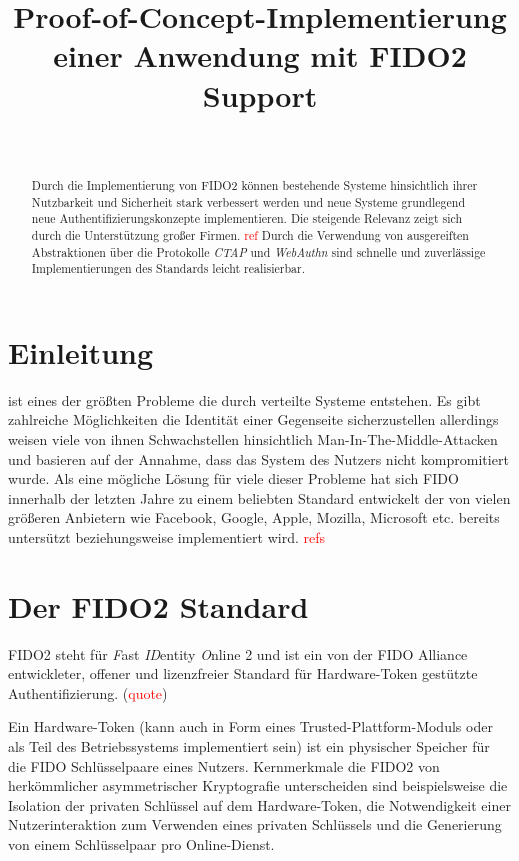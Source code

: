 \documentclass[journal]{IEEEtran}
\title{Proof-of-Concept-Implementierung einer Anwendung mit FIDO2 Support}
\author{
	\IEEEauthorblockN{Mara Schulke \textit{(Matrikel-Nr. 20215853)}}\\
	\IEEEauthorblockA{
		Technische Hochschule Brandenburg \\
		B.Sc. IT Sicherheit \\
		Hardware Sicherheit
	}
}
\begin{document}

\maketitle

\begin{abstract}
	Durch die Implementierung von FIDO2 können bestehende Systeme hinsichtlich
	ihrer Nutzbarkeit und Sicherheit stark verbessert werden und neue Systeme
	grundlegend neue Authentifizierungskonzepte implementieren. Die steigende
	Relevanz zeigt sich durch die Unterstützung großer Firmen.
	\textcolor{red}{ref} Durch die Verwendung von ausgereiften Abstraktionen
	über die Protokolle \textit{CTAP} und \textit{WebAuthn} sind schnelle und
	zuverlässige Implementierungen des Standards leicht realisierbar.
\end{abstract}

\section{Einleitung}
 ist eines der größten
Probleme die durch verteilte Systeme entstehen. Es gibt zahlreiche
Möglichkeiten die Identität einer Gegenseite sicherzustellen allerdings weisen
viele von ihnen Schwachstellen hinsichtlich Man-In-The-Middle-Attacken und
basieren auf der Annahme, dass das System des Nutzers nicht kompromitiert
wurde. Als eine mögliche Lösung für viele dieser Probleme hat sich FIDO
innerhalb der letzten Jahre zu einem beliebten Standard entwickelt der von
vielen größeren Anbietern wie Facebook, Google, Apple, Mozilla, Microsoft etc.
bereits untersützt beziehungsweise implementiert wird. \textcolor{red}{refs}

\section{Der FIDO2 Standard}

FIDO2 steht für \textit{F}ast \textit{ID}entity \textit{O}nline 2 und ist ein von
der FIDO Alliance entwickleter, offener und lizenzfreier Standard für
Hardware-Token gestützte Authentifizierung. (\textcolor{red}{quote})

Ein Hardware-Token (kann auch in Form eines Trusted-Plattform-Moduls oder als
Teil des Betriebssystems implementiert sein) ist ein physischer Speicher für
die FIDO Schlüsselpaare eines Nutzers. Kernmerkmale die FIDO2 von
herkömmlicher asymmetrischer Kryptografie unterscheiden sind beispielsweise die
Isolation der privaten Schlüssel auf dem Hardware-Token, die Notwendigkeit
einer Nutzerinteraktion zum Verwenden eines privaten Schlüssels und die
Generierung von einem Schlüsselpaar pro Online-Dienst.
\end{document}
